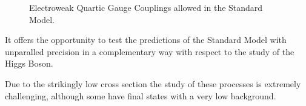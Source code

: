 \begin{figure}[ht]
  \centering
  \caption{Electroweak Quartic Gauge Couplings allowed in the Standard Model.}
  \label{fig:EWQGC}
\end{figure}

It offers the opportunity to test the predictions of the Standard Model with unparalled precision in a complementary way with respect to the study of the Higgs Boson.

Due to the strikingly low cross section the study of these processes is extremely challenging,
although some have final states with a very low background.

